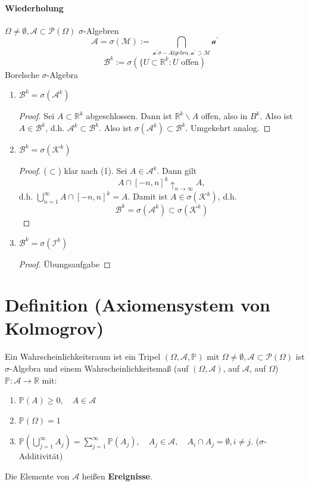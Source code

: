 \documentclass[a4paper,11pt,notitlepage]{report}
\newcommand{\R}{{\ensuremath{\mathbb{R}}}}
\newcommand{\Prim}{{\ensuremath{\mathbb{P}}}}
\begin{document}
\paragraph{Wiederholung}
$\Omega \neq \emptyset, \mathcal{A} \subset \mathcal{P}(\Omega)$ $\sigma$-Algebren
$$\mathcal{A} = \sigma(\mathcal{M}) := \bigcap\limits_{\mathcal{a}^\prime \sigma-Algebra, \mathcal{a}^\prime \supset \mathcal{M}}{\mathcal{a}^\prime}$$
$$\mathcal{B}^k := \sigma(\{U \subset \R^k \colon U \text{ offen})$$
Borelsche $\sigma$-Algebra

\begin{enumerate}
	\item $\mathcal{B}^k = \sigma(\mathcal{A}^k)$
\begin{proof}
	Sei $A \subset \R^k$ abgeschlossen.
	Dann ist $\R^k \backslash A$ offen, also in $B^k$. Also ist $A \in \mathcal{B}^k$, d.h. $\mathcal{A}^k \subset \mathcal{B}^k$. Also ist $\sigma(\mathcal{A}^k) \subset \mathcal{B}^k$. Umgekehrt analog.
\end{proof}
	\item $\mathcal{B}^k = \sigma(\mathcal{K}^k)$
	\begin{proof}
		($\subset$) klar nach (1).
		\newline
		Sei $A \in \mathcal{A}^k$. Dann gilt
		$$A \cap [-n,n]^k \uparrow_{n \rightarrow \infty} A,$$
		d.h. $\bigcup\limits_{n=1}^{\infty}{A \cap [-n,n]^k} = A.$
		\newline
		Damit ist $A \in \sigma(\mathcal{K}^k)$, d.h.
		$$\mathcal{B}^k = \sigma(\mathcal{A}^k) \subset \sigma(\mathcal{K}^k)$$
	\end{proof}
	\item $\mathcal{B}^k = \sigma(\mathcal{I}^k)$
	\begin{proof}
		Übungsaufgabe
	\end{proof}
\end{enumerate}

\section{Definition (Axiomensystem von Kolmogrov)}
Ein Wahrscheinlichkeitsraum ist ein Tripel $(\Omega, \mathcal{A}, \Prim)$ mit $\Omega \neq \emptyset, \mathcal{A} \subset \mathcal{P}(\Omega)$ ist $\sigma$-Algebra und einem Wahrscheinlichkeitsmaß (auf $(\Omega, \mathcal{A})$, auf $\mathcal{A}$, auf $\Omega$) $\Prim \colon \mathcal{A} \rightarrow \R$ mit:
\begin{enumerate}
	\item $\Prim(A) \geq 0, \quad A \in \mathcal{A}$
	\item $\Prim(\Omega) = 1$
	\item $\Prim(\bigcup\limits_{j=1}^{\infty}{A_j}) = \sum\limits_{j=1}^{\infty}{\Prim(A_j)}, \quad A_j \in \mathcal{A}, \quad A_i \cap A_j = \emptyset, i \neq j$. ($\sigma$-Additivität)
\end{enumerate}
Die Elemente von $\mathcal{A}$ heißen \textbf{Ereignisse}.
\end{document}
